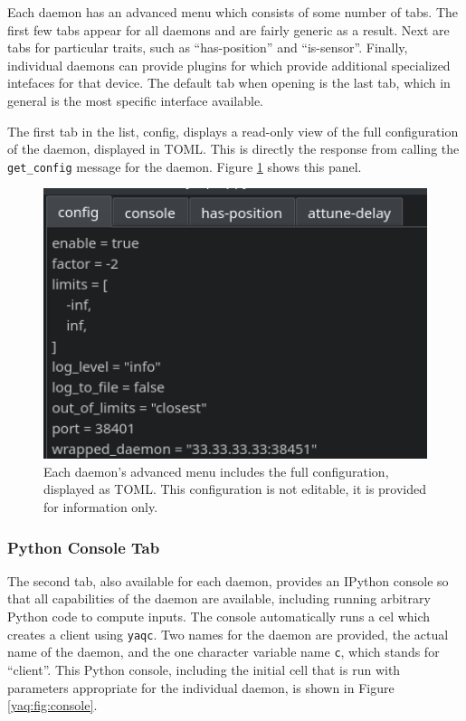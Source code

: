 Each daemon has an advanced menu which consists of some number of tabs.
The first few tabs appear for all daemons and are fairly generic as a result.
Next are tabs for particular traits, such as ``has-position'' and ``is-sensor''.
Finally, individual daemons can provide plugins for \yaqcqtpy{} which provide additional specialized intefaces for that device.
The default tab when opening is the last tab, which in general is the most specific interface available.

The first tab in the list, config, displays a read-only view of the full configuration of the daemon, displayed in TOML.
This is directly the response from calling the \texttt{get\_config} message for the daemon.
Figure \ref{yaq:fig:config} shows this panel.

\begin{figure}
\includegraphics[width=4.5in]{"yaq/images/config"}
\caption[\yaqcqtpy{} Configuration Tab]{
	Each daemon's advanced menu includes the full configuration, displayed as TOML.
	This configuration is not editable, it is provided for information only.
}
\label{yaq:fig:config}
\end{figure}

\subsubsection{Python Console Tab}

The second tab, also available for each daemon, provides an IPython\cite{} console so that all capabilities of the daemon are available, including running arbitrary Python code to compute inputs.
The console automatically runs a cel which creates a client using \texttt{yaqc}.
Two names for the daemon are provided, the actual name of the daemon, and the one character variable name \texttt{c}, which stands for ``client''.
This Python console, including the initial cell that is run with parameters appropriate for the individual daemon, is shown in Figure \ref{yaq:fig:console}.

